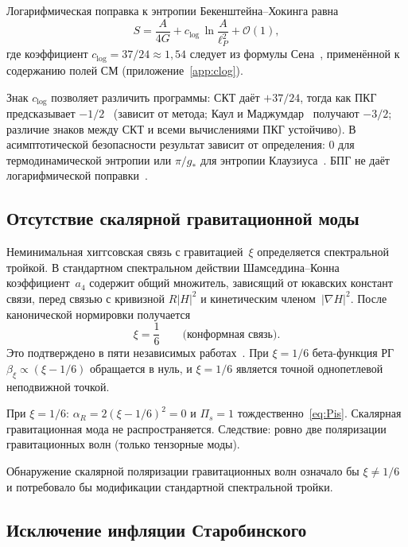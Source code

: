 \documentclass[12pt,a4paper]{article}
\theoremstyle{plain}
\theoremstyle{definition}
\theoremstyle{remark}
\newcommand{\order}{\mathcal{O}}
\begin{document}
Логарифмическая поправка к энтропии Бекенштейна--Хокинга равна
\begin{equation}\label{eq:clog}
  S = \frac{A}{4G} + c_{\log}\, \ln\frac{A}{\ell_P^2}
  + \order(1),
\end{equation}
где коэффициент $c_{\log} = 37/24 \approx 1{,}54$ следует из
формулы Сена~\cite{Sen:2012}, применённой к содержанию полей СМ
(приложение~\ref{app:clog}).

Знак $c_{\log}$ позволяет различить программы: СКТ даёт $+37/24$,
тогда как ПКГ предсказывает
$-1/2$~\cite{Meissner:2004} (зависит от метода; Каул и
Маджумдар~\cite{KaulMajumdar:2000} получают $-3/2$;
различие знаков между СКТ и всеми вычислениями ПКГ устойчиво).
В асимптотической безопасности результат зависит от определения:
$0$ для термодинамической энтропии или $\pi/g_*$ для энтропии
Клаузиуса~\cite{FallsLitim:2012}. БПГ не даёт логарифмической
поправки~\cite{Myung:2017}.

\subsection{Отсутствие скалярной гравитационной моды}
\label{sec:scalar}

Неминимальная хиггсовская связь с гравитацией~$\xi$ определяется
спектральной тройкой. В стандартном спектральном действии
Шамседдина--Конна коэффициент~$a_4$ содержит общий множитель, зависящий от
юкавских констант связи, перед связью с кривизной $R|H|^2$
и кинетическим членом~$|\nabla H|^2$. После канонической нормировки
получается~\cite{CCM:2006,CC:2010,CCS:2013,vS:2015,DLM:2014}
\begin{equation}
  \xi = \frac{1}{6}\qquad\text{(конформная связь)}.
\end{equation}
Это подтверждено в пяти независимых
работах~\cite{CCM:2006,CC:2010,CCS:2013,vS:2015,DLM:2014}.
При $\xi = 1/6$ бета-функция РГ $\beta_\xi \propto (\xi - 1/6)$
обращается в нуль, и $\xi = 1/6$ является точной однопетлевой
неподвижной точкой.

При $\xi = 1/6$: $\alpha_R = 2(\xi - 1/6)^2 = 0$ и $\Pi_s = 1$
тождественно~\eqref{eq:Pis}. Скалярная гравитационная мода не
распространяется. Следствие: ровно две поляризации гравитационных
волн (только тензорные моды).

Обнаружение скалярной поляризации гравитационных волн означало бы
$\xi \neq 1/6$ и потребовало бы модификации стандартной спектральной
тройки.

\subsection{Исключение инфляции Старобинского}
\label{sec:inflation}
\end{document}
